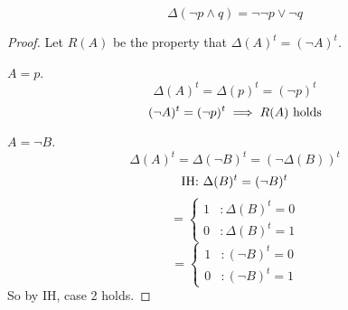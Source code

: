 \documentclass[12pt]{article}
\begin{document}
\bboxex
{}
\[\Delta(\neg p\wedge q)=\neg\neg p\vee\neg q\]
\ebox

\bboxproof
\begin{proof}
  Let \(R(A)\) be the property that \(\Delta(A)^t=(\neg A)^t\). 

   \(A=p\).
  \[\Delta(A)^t=\Delta(p)^t=(\neg p)^t\]
  \[(\neg A)^t=(\neg p)^t\implies R(A)\text{ holds}\]

   \(A=\neg B\).
  \[\Delta(A)^t=\Delta(\neg B)^t=(\neg\Delta(B))^t\]
  \[\text{IH: }\Delta(B)^t=(\neg B)^t\]
  \[=\begin{cases}
    1&:\Delta(B)^t=0\\
    0&:\Delta(B)^t=1
  \end{cases}
  \]
  \[=\begin{cases}
    1&:(\neg B)^t=0\\
    0&:(\neg B)^t=1
  \end{cases}\]
  So by IH, case 2 holds.
\end{proof}
\ebox


\end{document}
